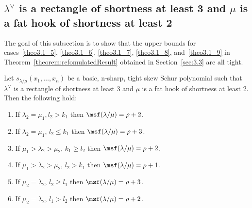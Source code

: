 \subsection{\texorpdfstring{$\lambda^\vee$}{lambda vee} is a rectangle of shortness at least 3 and \texorpdfstring{$\mu$}{mu} is a fat hook of shortness at least 2}

The goal of this subsection is to show that the upper bounds for cases~\ref{theo3.1_5}, \ref{theo3.1_6}, \ref{theo3.1_7}, \ref{theo3.1_8}, and~\ref{theo3.1_9} in Theorem~\ref{theorem:refomulatedResult} obtained in Section~\ref{sec:3.3} are all tight.

\begin{theorem}
\label{thm:necessaryshort3}
Let $s_{\lambda/\mu}(x_1,\ldots,x_n)$ be a basic, n-sharp, tight skew Schur polynomial such that $\lambda^\vee$ is a rectangle of shortness at least $3$ and $\mu$ is a fat hook of shortness at least $2$. Then the following hold:
\begin{enumerate}[label=(\Roman*)]
 \item\label{theo4.6_1} If $\lambda_2 = \mu_1, l_2 > k_1$ then $\msf (\lambda/\mu) = \rho+2$.
 \item\label{theo4.6_2} If $\lambda_2 = \mu_1$, $l_2 \leq k_1$ then $\msf (\lambda/\mu) = \rho+3$.
 \item\label{theo4.6_3} If $\mu_1 > \lambda_2 > \mu_2$, $k_1 \geq l_2$ then $\msf (\lambda/\mu) = \rho+2$.
 \item\label{theo4.6_4} If $\mu_1 > \lambda_2 > \mu_2$, $l_2 > k_1$ then $\msf (\lambda/\mu) = \rho+1$.
 \item\label{theo4.6_5} If $\mu_2 = \lambda_2$, $l_2 \geq l_1$ then $\msf (\lambda/\mu) = \rho+3$.
 \item\label{theo4.6_6} If $\mu_2 = \lambda_2$, $l_1 > l_2$ then $\msf (\lambda/\mu) = \rho+2$.
\end{enumerate}
\end{theorem}

